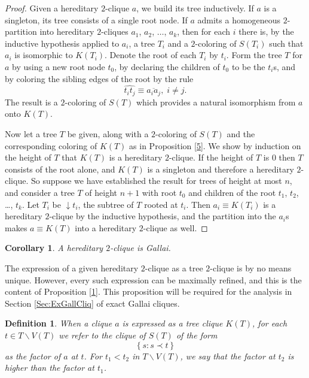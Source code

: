 \documentclass[12pt]{amsart}
\theoremstyle{plain}
\newtheorem{corollary}[theorem]{Corollary}
\newtheorem{definition}[theorem]{Definition}
\numberwithin{equation}{section}
\begin{document}
\begin{proof}
Given a hereditary $2$-clique $a$, we build its tree inductively. If $a$ is a
singleton, its tree consists of a single root node. If $a$ admits a homogeneous
$2$-partition into hereditary $2$-cliques $a_{1}$, $a_{2}$, $\ldots$, $a_{k}$,
then for each $i$ there is, by the inductive hypothesis applied to $a_{i}$, a
tree $T_{i}$ and a $2$-coloring of $S\left( T_{i}\right)  $ such that $a_{i}$
is isomorphic to $K\left(  T_{i}\right)  $. Denote the root of each $T_{i}$ by
$t_{i}$. Form the tree $T$ for $a$ by using a new root node $t_{0}$, by
declaring the children of $t_{0}$ to be the $t_{i}$s, and by coloring the
sibling edges of the root by the rule
\begin{displaymath}
    \widehat{t_{i}t_{j}}\equiv\overline{a_{i}a_{j}},\;i\neq j.
\end{displaymath}
The result is a $2$-coloring of $S\left(  T\right)  $ which provides a natural
isomorphism from $a$ onto $K\left(  T\right)  $.

Now let a tree $T$ be given, along with a $2$-coloring of $S\left(  T\right)
$ and the corresponding coloring of $K\left(  T\right)  $ as in Proposition
\ref{5}. We show by induction on the height of $T$ that $K\left(  T\right)  $
is a hereditary $2$-clique. If the height of $T$ is $0$ then $T$ consists of
the root alone, and $K\left(  T\right)  $ is a singleton and therefore a
hereditary $2$-clique. So suppose we have established the result for trees of
height at most $n$, and consider a tree $T$ of height $n+1$ with root $t_{0}$
and children of the root $t_{1}$, $t_{2}$, \ldots, $t_{k}$. Let $T_{i}$ be
$\downarrow\!t_{i}$, the subtree of $T$ rooted at $t_{i}$. Then $a_{i}\equiv
K\left(  T_{i}\right)  $ is a hereditary $2$-clique by the inductive
hypothesis, and the partition into the $a_{i}$s makes $a\equiv K\left(
T\right)  $ into a hereditary $2$-clique as well.
\end{proof}

\begin{corollary}
\label{12}A hereditary $2$-clique is Gallai.
\end{corollary}

The expression of a given hereditary $2$-clique as a tree $2$-clique is by no
means unique. However, every such expression can be maximally refined, and
this is the content of Proposition \ref{1}. This proposition will be required
for the analysis in Section \ref{Sec:ExGallCliq} of exact Gallai cliques.

\begin{definition}
When a clique $a$ is expressed as a tree clique $K\left(  T\right)  $, for
each $t\in T\smallsetminus V\left(  T\right)  $ we refer to the clique of
$S(T)$ of the form
\begin{displaymath}
    \left\{  s:s\prec t\right\}
\end{displaymath}
as \emph{the factor of }$a$\emph{ at }$t$. For $t_{1}<t_{2}$ in
$T\smallsetminus V\left(  T\right)  $, we say that the factor at $t_{2}$ is
\emph{higher} than the factor at $t_{1}$.
\end{definition}
\end{document}
